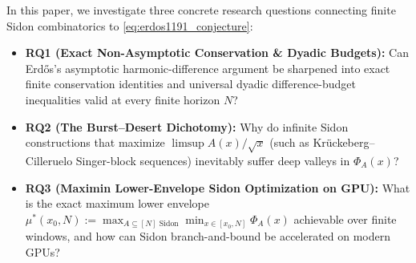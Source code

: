 \documentclass[11pt,reqno]{amsart}
\theoremstyle{definition}
\theoremstyle{remark}
\begin{document}
In this paper, we investigate three concrete research questions connecting finite Sidon combinatorics to \eqref{eq:erdos1191_conjecture}:
\begin{itemize}
  \item \textbf{RQ1 (Exact Non-Asymptotic Conservation \& Dyadic Budgets):} Can Erd\H{o}s's asymptotic harmonic-difference argument be sharpened into exact finite conservation identities and universal dyadic difference-budget inequalities valid at every finite horizon $N$?
  \item \textbf{RQ2 (The Burst--Desert Dichotomy):} Why do infinite Sidon constructions that maximize $\limsup A(x)/\sqrt{x}$ (such as Kr\"uckeberg--Cilleruelo Singer-block sequences) inevitably suffer deep valleys in $\Phi_A(x)$?
  \item \textbf{RQ3 (Maximin Lower-Envelope Sidon Optimization on GPU):} What is the exact maximum lower envelope $\mu^*(x_0, N) := \max_{A \subseteq [N]\text{ Sidon}} \min_{x \in [x_0, N]} \Phi_A(x)$ achievable over finite windows, and how can Sidon branch-and-bound be accelerated on modern GPUs?
\end{itemize}
\end{document}

